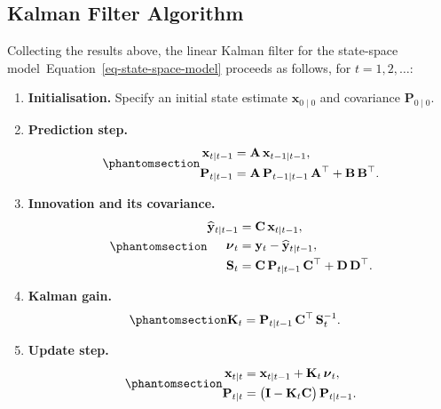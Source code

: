 \documentclass[
  letterpaper,
  DIV=11,
  numbers=noendperiod]{scrreprt}
\begin{document}
\subsection*{Kalman Filter Algorithm}\label{kalman-filter-algorithm}

Collecting the results above, the linear Kalman filter for the
state-space model~Equation~\ref{eq-state-space-model} proceeds as
follows, for \(t = 1,2,\ldots\):

\begin{enumerate}
\def\labelenumi{\arabic{enumi}.}
\item
  \textbf{Initialisation.} Specify an initial state estimate
  \(\mathbf{x}_{0\mid 0}\) and covariance \(\mathbf{P}_{0\mid 0}\).
\item
  \textbf{Prediction step.}
  \begin{equation}\protect\phantomsection\label{eq-gen-0126}{
  \begin{align}
        \mathbf{x}_{t\mid t-1}
          &= \mathbf{A}\,\mathbf{x}_{t-1\mid t-1}, \\
        \mathbf{P}_{t\mid t-1}
          &= \mathbf{A}\,\mathbf{P}_{t-1\mid t-1}\,\mathbf{A}^\top
             + \mathbf{B}\,\mathbf{B}^\top.
  \end{align}
  }\end{equation}
\item
  \textbf{Innovation and its covariance.}
  \begin{equation}\protect\phantomsection\label{eq-gen-0127}{
  \begin{align}
        \widehat{\mathbf{y}}_{t\mid t-1}
          &= \mathbf{C}\,\mathbf{x}_{t\mid t-1}, \\
        \boldsymbol{\nu}_t
          &= \mathbf{y}_t - \widehat{\mathbf{y}}_{t\mid t-1}, \\
        \mathbf{S}_t
          &= \mathbf{C}\,\mathbf{P}_{t\mid t-1}\,\mathbf{C}^\top
             + \mathbf{D}\,\mathbf{D}^\top.
  \end{align}
  }\end{equation}
\item
  \textbf{Kalman gain.}
  \begin{equation}\protect\phantomsection\label{eq-gen-0128}{
  \begin{align}
        \mathbf{K}_t
          &= \mathbf{P}_{t\mid t-1}\,\mathbf{C}^\top\,\mathbf{S}_t^{-1}.
  \end{align}
  }\end{equation}
\item
  \textbf{Update step.}
  \begin{equation}\protect\phantomsection\label{eq-gen-0129}{
  \begin{align}
        \mathbf{x}_{t\mid t}
          &= \mathbf{x}_{t\mid t-1} + \mathbf{K}_t\,\boldsymbol{\nu}_t, \\
        \mathbf{P}_{t\mid t}
          &= \big(\mathbf{I} - \mathbf{K}_t \mathbf{C}\big)\,\mathbf{P}_{t\mid t-1}.
  \end{align}
  }\end{equation}
\end{enumerate}
\end{document}
